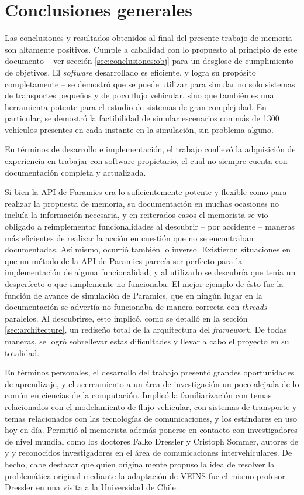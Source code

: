 \section{Conclusiones generales}

Las conclusiones y resultados obtenidos al final del presente trabajo de memoria son altamente positivos. Cumple a cabalidad con lo propuesto al principio de este documento -- ver sección \ref{sec:conclusiones:obj} para un desglose de cumplimiento de objetivos. El \emph{software} desarrollado es eficiente, y logra su propósito completamente -- se demostró que se puede utilizar para simular no solo sistemas de transportes pequeños y de poco flujo vehicular, sino que también es una herramienta potente para el estudio de sistemas de gran complejidad. En particular, se demostró la factibilidad de simular escenarios con más de 1300 vehículos presentes en cada instante en la simulación, sin problema alguno. 

En términos de desarrollo e implementación, el trabajo conllevó la adquisición de experiencia en trabajar con software propietario, el cual no siempre cuenta con documentación completa y actualizada. 

Si bien la API de Paramics era lo suficientemente potente y flexible como para realizar la propuesta de memoria, su documentación en muchas ocasiones no incluía la información necesaria, y en reiterados casos el memorista se vio obligado a reimplementar funcionalidades al descubrir -- por accidente -- maneras más eficientes de realizar la acción en cuestión que no se encontraban documentadas. 
Así mismo, ocurrió también lo inverso. Existieron situaciones en que un método de la API de Paramics parecía ser perfecto para la implementación de alguna funcionalidad, y al utilizarlo se descubría que tenía un desperfecto o que simplemente no funcionaba. El mejor ejemplo de ésto fue la función de avance de simulación de Paramics, que en ningún lugar en la documentación se advertía no funcionaba de manera correcta con \emph{threads} paralelos. Al descubrirse, esto implicó, como se detalló en la sección \ref{sec:architecture}, un rediseño total de la arquitectura del \emph{framework}. De todas maneras, se logró sobrellevar estas dificultades y llevar a cabo el proyecto en su totalidad.

En términos personales, el desarrollo del trabajo presentó grandes oportunidades de aprendizaje, y el acercamiento a un área de investigación un poco alejada de lo común en ciencias de la computación. Implicó la familiarización con temas relacionados con el modelamiento de flujo vehicular, con sistemas de transporte y temas relacionados con las tecnologías de comunicaciones, y los estándares en uso hoy en día. Permitió al memorista además ponerse en contacto con investigadores de nivel mundial como los doctores Falko Dressler y Cristoph Sommer, autores de \autocite{sommer_german_dressler} y \autocite{sommer_dressler2} y reconocidos investigadores en el área de comunicaciones intervehiculares. De hecho, cabe destacar que quien originalmente propuso la idea de resolver la problemática original mediante la adaptación de VEINS fue el mismo profesor Dressler en una visita a la Universidad de Chile.

